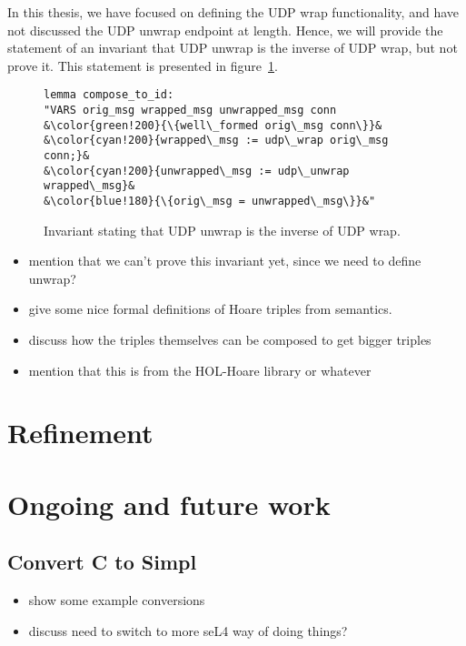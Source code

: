 \documentclass[twoside]{memoir}
\begin{document}
In this thesis, we have focused on defining the UDP wrap functionality,
and have not discussed the UDP unwrap endpoint at length.
Hence, we will provide the statement of an invariant 
that UDP unwrap is the inverse of UDP wrap, but not prove it.
This statement is presented in figure~\ref{fig:inv-unwrap-wrap}.


\begin{figure}[htpb]
    \centering
\begin{lstlisting}[language=isabelle]
lemma compose_to_id:
"VARS orig_msg wrapped_msg unwrapped_msg conn
&\color{green!200}{\{well\_formed orig\_msg conn\}}&
&\color{cyan!200}{wrapped\_msg := udp\_wrap orig\_msg conn;}&
&\color{cyan!200}{unwrapped\_msg := udp\_unwrap wrapped\_msg}&
&\color{blue!180}{\{orig\_msg = unwrapped\_msg\}}&"
\end{lstlisting}
    \caption{Invariant stating that UDP unwrap is the inverse of UDP wrap.}
    \label{fig:inv-unwrap-wrap}
\end{figure}

\begin{itemize}
    \item mention that we can't prove this invariant yet, since we need
        to define unwrap?
    \item give some nice formal definitions of Hoare triples
        from semantics.
    \item discuss how the triples themselves can be composed to get bigger triples
    \item mention that this is from the HOL-Hoare library or whatever
\end{itemize}



\section{Refinement}

\section{Ongoing and future work}
\subsection{Convert C to Simpl}
\begin{itemize}
    \item show some example conversions
    \item discuss need to switch to more seL4 way of doing things?
\end{itemize}
\end{document}
